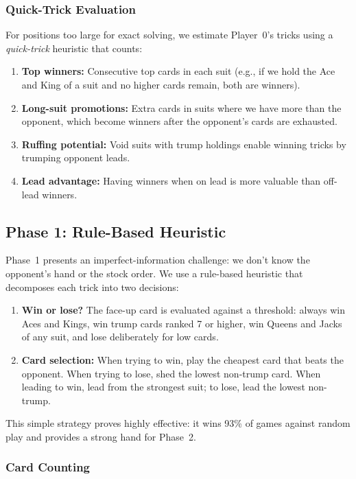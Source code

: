 \subsubsection{Quick-Trick Evaluation}

For positions too large for exact solving, we estimate Player~0's tricks using
a \emph{quick-trick} heuristic that counts:
\begin{enumerate}
  \item \textbf{Top winners:} Consecutive top cards in each suit (e.g., if we
    hold the Ace and King of a suit and no higher cards remain, both are
    winners).
  \item \textbf{Long-suit promotions:} Extra cards in suits where we have
    more than the opponent, which become winners after the opponent's cards
    are exhausted.
  \item \textbf{Ruffing potential:} Void suits with trump holdings enable
    winning tricks by trumping opponent leads.
  \item \textbf{Lead advantage:} Having winners when on lead is more valuable
    than off-lead winners.
\end{enumerate}

\subsection{Phase 1: Rule-Based Heuristic}

Phase~1 presents an imperfect-information challenge: we don't know the
opponent's hand or the stock order. We use a rule-based heuristic that
decomposes each trick into two decisions:

\begin{enumerate}
  \item \textbf{Win or lose?} The face-up card is evaluated against a
    threshold: always win Aces and Kings, win trump cards ranked 7 or higher,
    win Queens and Jacks of any suit, and lose deliberately for low cards.
  \item \textbf{Card selection:} When trying to win, play the cheapest card
    that beats the opponent. When trying to lose, shed the lowest non-trump
    card. When leading to win, lead from the strongest suit; to lose, lead
    the lowest non-trump.
\end{enumerate}

This simple strategy proves highly effective: it wins 93\% of games against
random play and provides a strong hand for Phase~2.

\subsubsection{Card Counting}

